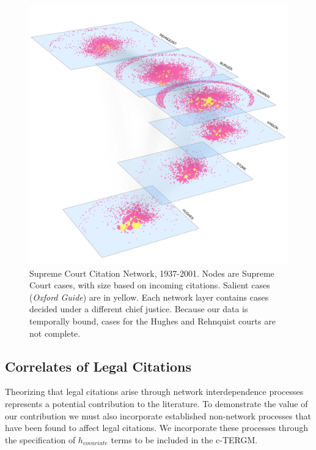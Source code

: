 \documentclass[headsepline=true, abstracton]{scrartcl}
\begin{document}
\begin{figure}[htp]
\includegraphics[scale=0.35,clip=true,trim=.5cm 0cm 0cm 2cm]{images/citations1}
\caption{ Supreme Court Citation Network, 1937-2001. Nodes are Supreme Court cases, with size based on incoming citations. Salient cases ({\em Oxford Guide}) are in yellow. Each network layer contains cases decided under a different chief justice. Because our data is temporally bound, cases for the Hughes and Rehnquist courts are not complete. }
 \label{fig:networkviz}
\vspace{-.25cm}
\end{figure}


\subsection{Correlates of Legal Citations}

Theorizing that legal citations arise through network interdependence processes represents a potential contribution to the literature. To demonstrate the value of our contribution we must also incorporate established non-network processes that have been found to affect legal citations. We incorporate these processes through the specification of $h_{covariate}$  terms to be included in the c-TERGM. 
\end{document}
